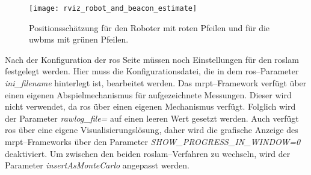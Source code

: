 \begin{figure}[h]
	\centering
	\texttt{[image: rviz\_robot\_and\_beacon\_estimate]}
	\caption{Positionsschätzung für den Roboter mit roten Pfeilen und für die \Glspl{uwbm} mit grünen Pfeilen.}
	\label{fig:rviz_robot_and_beacon_estimate}
\end{figure}

Nach der Konfiguration der \Gls{ros} Seite müssen noch Einstellungen für den \Gls{roslam} festgelegt werden. Hier muss die Konfigurationsdatei, die in dem \Gls{ros}--Parameter \textit{ini\_filename} hinterlegt ist, bearbeitet werden. Das \Gls{mrpt}--Framework verfügt über einen eigenen Abspielmechanismus für aufgezeichnete Messungen. Dieser wird nicht verwendet, da \Gls{ros} über einen eigenen Mechanismus verfügt. Folglich wird der Parameter \textit{rawlog\_file=} auf einen leeren Wert gesetzt werden. Auch verfügt \Gls{ros} über eine eigene Visualisierungslösung, daher wird die grafische Anzeige des \Gls{mrpt}--Frameworks über den Parameter \textit{SHOW\_PROGRESS\_IN\_WINDOW=0} deaktiviert. Um zwischen den beiden \Gls{roslam}--Verfahren zu wechseln, wird der Parameter \textit{insertAsMonteCarlo} angepasst werden.

